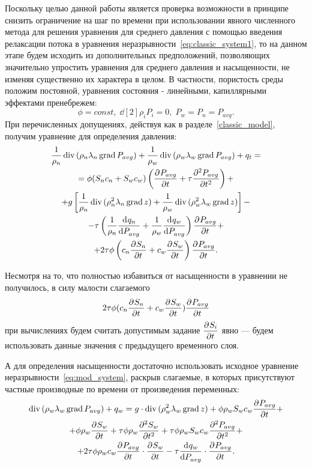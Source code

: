 Поскольку целью данной работы является проверка возможности в принципе снизить ограничение на шаг по времени при
использовании явного численного метода для решения уравнения для среднего давления
с помощью введения релаксации потока в уравнения неразрывности~\eqref{eq:classic_system1}, то на данном этапе
будем исходить из дополнительных предположений, позволяющих значительно упростить уравнения для среднего давления
и насыщенности, не изменяя существенно их характера в целом. В частности, пористость среды положим постояной,
уравнения состояния - линейными, капиллярными эффектами пренебрежем:
\begin{equation}
\phi = const,\; \dd[2]{\rho_i}{P_i} = 0,\;P_w = P_n = P_{avg}.
\end{equation}
При перечисленных допущениях, действуя как в разделе~\ref{classic_model}, получим уравнение для определения давления:
\begin{equation} \label{eq:mod_pressure}
 \begin{gathered}
  \frac{1}{\rho_n} \diver{ (\rho_n\lambda_n\grad{ P_{avg}})} + \frac{1}{\rho_w} \diver{ (\rho_w\lambda_w\grad{ P_{avg}})} + q_t =\\
  = \phi (S_n c_n + S_w c_w) \left( \pd{P_{avg}}{t} + \tau \pd[2]{P_{avg}}{t} \right) +\\
  + g \left[ \frac{1}{\rho_n} \diver{ (\rho_n^2\lambda_n\grad{ z})} + \frac{1}{\rho_w} \diver{ (\rho_w^2\lambda_w\grad{ z})} \right]  -\\
  -  \tau \left(\frac{1}{\rho_n}\dd{q_n}{P_{avg}} + \frac{1}{\rho_w}\dd{q_w}{P_{avg}}\right) \pd{P_{avg}}{t} +\\
  + 2 \tau \phi \left(c_n \pd{S_n}{t} + c_w\pd{S_w}{t}\right) \pd{P_{avg}}{t}.
 \end{gathered}
\end{equation}

Несмотря на то, что полностью избавиться от насыщенности в уравнении не получилось, в силу малости слагаемого
\begin{equation*}
 2 \tau \phi (c_n \pd{S_n}{t} + c_w\pd{S_w}{t}) \pd{P_{avg}}{t}
\end{equation*}
при вычислениях будем считать допустимым задание $\pd{S_i}{t}$ явно --- будем использовать данные
значения с предыдущего временного слоя.

А для определения насыщенности достаточно использовать исходное уравнение неразрывности~\eqref{eq:mod_system},
раскрыв слагаемые, в которых присутствуют частные производные по времени от произведения переменных:
\begin{equation} \label{eq:mod_saturation}
 \begin{gathered}
  \diver{ (\rho_w\lambda_w \grad{ P_{avg}})} + q_w = g \cdot \diver{ (\rho_w^2\lambda_w \grad{ z})} + \phi \rho_w S_w c_w  \pd{P_{avg}}{t} +\\
  + \phi \rho_w \pd{S_w}{t} + \tau \phi \rho_w \pd[2]{S_w}{t} + \tau \phi \rho_w S_w c_w \pd[2]{P_{avg}}{t} +\\
  + 2 \tau \phi \rho_w c_w \pd{P_{avg}}{t} \cdot \pd{S_w}{t} - \tau \dd{q_w}{P_{avg}} \cdot \pd{P_{avg}}{t}.
 \end{gathered}
\end{equation}

